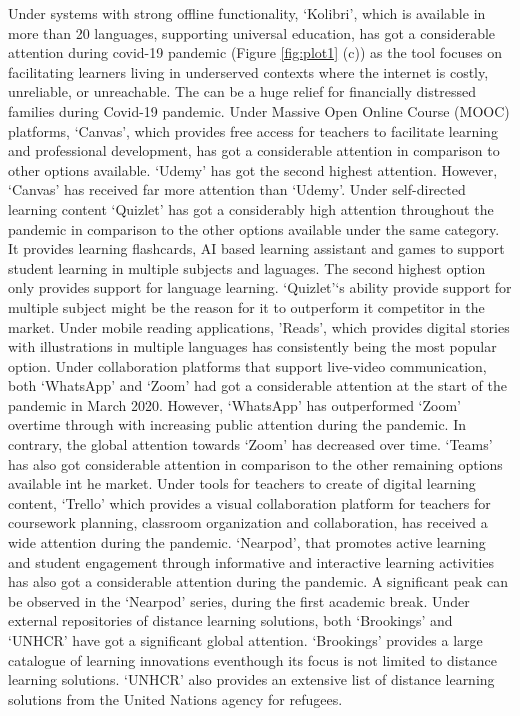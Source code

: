 \documentclass[11pt,a4paper,]{article}
\begin{document}
Under systems with strong offline functionality, `Kolibri', which is available in more than 20 languages, supporting universal education, has got a considerable attention during covid-19 pandemic (Figure \ref{fig:plot1} (c)) as the tool focuses on facilitating learners living in underserved contexts where the internet is costly, unreliable, or unreachable. The can be a huge relief for financially distressed families during Covid-19 pandemic. Under Massive Open Online Course (MOOC) platforms, `Canvas', which provides free access for teachers to facilitate learning and professional development, has got a considerable attention in comparison to other options available. `Udemy' has got the second highest attention. However, `Canvas' has received far more attention than `Udemy'. Under self-directed learning content `Quizlet' has got a considerably high attention throughout the pandemic in comparison to the other options available under the same category. It provides learning flashcards, AI based learning assistant and games to support student learning in multiple subjects and laguages. The second highest option only provides support for language learning. `Quizlet'`s ability provide support for multiple subject might be the reason for it to outperform it competitor in the market. Under mobile reading applications, 'Reads', which provides digital stories with illustrations in multiple languages has consistently being the most popular option. Under collaboration platforms that support live-video communication, both `WhatsApp' and `Zoom' had got a considerable attention at the start of the pandemic in March 2020. However, `WhatsApp' has outperformed `Zoom' overtime through with increasing public attention during the pandemic. In contrary, the global attention towards `Zoom' has decreased over time. `Teams' has also got considerable attention in comparison to the other remaining options available int he market. Under tools for teachers to create of digital learning content, `Trello' which provides a visual collaboration platform for teachers for coursework planning, classroom organization and collaboration, has received a wide attention during the pandemic. `Nearpod', that promotes active learning and student engagement through informative and interactive learning activities has also got a considerable attention during the pandemic. A significant peak can be observed in the `Nearpod' series, during the first academic break. Under external repositories of distance learning solutions, both `Brookings' and `UNHCR' have got a significant global attention. `Brookings' provides a large catalogue of learning innovations eventhough its focus is not limited to distance learning solutions. `UNHCR' also provides an extensive list of distance learning solutions from the United Nations agency for refugees.
\end{document}
